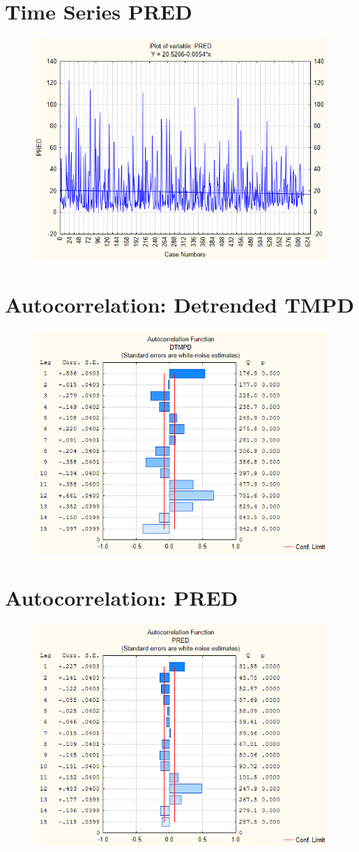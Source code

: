 \documentclass[12pt,a4paper]{article}
\begin{document}
\section{Time Series PRED}
\begin{figure}[h]
	\centering
	\includegraphics[width=0.7\linewidth]{"TimeSeries PRED"}
	\caption{}
	\label{fig:timeseries-pred}
\end{figure}
\newpage
\section{Autocorrelation: Detrended TMPD}
\begin{figure}[h]
	\centering
	\includegraphics[width=0.7\linewidth]{"Autocorrelation DTMPD"}
	\caption{}
	\label{fig:autocorrelation-dtmpd}
\end{figure}
\newpage
\section{Autocorrelation: PRED}
\begin{figure}[h]
	\centering
	\includegraphics[width=0.7\linewidth]{"Autocorrelation PRED"}
	\caption{}
	\label{fig:autocorrelation-pred}
\end{figure}
\newpage
\end{document}
